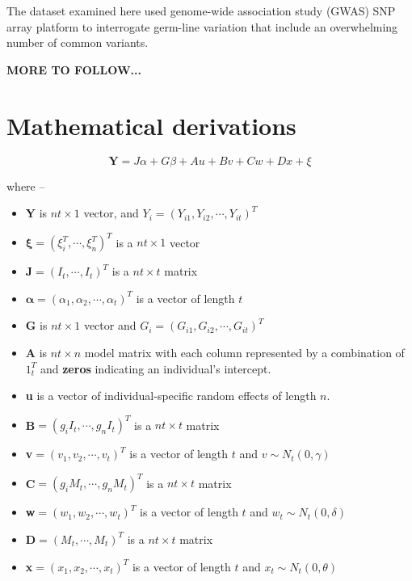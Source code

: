 \documentclass[hidelinks]{article}
\begin{document}
The dataset examined here used genome-wide association study (GWAS) SNP array platform to interrogate germ-line variation that include an overwhelming number of common variants. 

\textbf{MORE TO FOLLOW...}

\section{Mathematical derivations}

\begingroup
\large
\begin{equation}
\textbf{Y} = J \alpha + G\beta + Au + Bv + Cw + Dx  + \xi
\end{equation}
\endgroup

where --

\begin{itemize}
\large
\item \textbf{Y} is \emph{$nt \times 1$} vector, and $Y_i = \left(Y_{i1}, Y_{i2}, \cdots , Y_{it} \right)^T$
\item $\boldsymbol{\xi} = \left( \xi_i^T, \cdots , \xi_n^T \right)^T$ is a \emph{$nt \times 1$} vector
\item $\boldsymbol{J} = \left( I_t, \cdots , I_t \right)^T$ is a $nt \times t$ matrix
\item $\boldsymbol{\alpha} =\left( \alpha_1, \alpha_2, \cdots , \alpha_t \right)^T$ is a vector of length $t$
\item \textbf{G} is $nt \times 1$ vector and $G_i = \left(G_{i1}, G_{i2}, \cdots , G_{it} \right)^T$
\item \textbf{A} is $nt \times n$ model matrix with each column represented by a combination of $1_t^T$ and \textbf{zeros} indicating an individual's intercept. 
\item \textbf{u} is a vector of individual-specific random effects of length $n$.
\item \textbf{B}$=\left(g_i I_t, \cdots , g_n I_t \right)^T$ is a $nt \times t$ matrix
\item \textbf{v}$=\left(v_1, v_2, \cdots, v_t\right)^T$ is a vector of length $t$ and $v \sim N_t \left(0, \gamma \right)$
\item \textbf{C}$=\left(g_i M_t, \cdots , g_n M_t \right)^T$ is a $nt \times t$ matrix
\item \textbf{w}$=\left(w_1, w_2, \cdots, w_t\right)^T$ is a vector of length $t$ and $w_{t} \sim N_t \left(0, \delta \right)$
\item \textbf{D}$=\left( M_t, \cdots, M_t \right)^T$ is a $nt \times t$ matrix
\item \textbf{x}$=\left(x_1, x_2, \cdots, x_t\right)^T$ is a vector of length $t$ and $x_t \sim N_t \left(0, \theta \right)$
\end{itemize}
\end{document}
